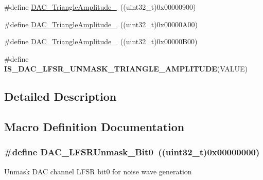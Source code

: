 \begin{DoxyCompactItemize}
\item 
\#define \hyperlink{group___d_a_c__lfsrunmask__triangleamplitude_ga7d573b0cebb1b939bd83367effb93d89}{D\+A\+C\+\_\+\+Triangle\+Amplitude\+\_}~((uint32\+\_\+t)0x00000900)
\item 
\#define \hyperlink{group___d_a_c__lfsrunmask__triangleamplitude_gad33d28d7fcc09d84500ea9b6e6c5feed}{D\+A\+C\+\_\+\+Triangle\+Amplitude\+\_}~((uint32\+\_\+t)0x00000\+A00)
\item 
\#define \hyperlink{group___d_a_c__lfsrunmask__triangleamplitude_ga3ce69f5a63a2464dc4b5f73cb6fe72f5}{D\+A\+C\+\_\+\+Triangle\+Amplitude\+\_}~((uint32\+\_\+t)0x00000\+B00)
\item 
\#define {\bfseries I\+S\+\_\+\+D\+A\+C\+\_\+\+L\+F\+S\+R\+\_\+\+U\+N\+M\+A\+S\+K\+\_\+\+T\+R\+I\+A\+N\+G\+L\+E\+\_\+\+A\+M\+P\+L\+I\+T\+U\+DE}(V\+A\+L\+UE)
\end{DoxyCompactItemize}


\subsection{Detailed Description}


\subsection{Macro Definition Documentation}
\subsubsection[{\texorpdfstring{D\+A\+C\+\_\+\+L\+F\+S\+R\+Unmask\+\_\+\+Bit0}{DAC_LFSRUnmask_Bit0}}]{\setlength{\rightskip}{0pt plus 5cm}\#define D\+A\+C\+\_\+\+L\+F\+S\+R\+Unmask\+\_\+\+Bit0~((uint32\+\_\+t)0x00000000)}\hypertarget{group___d_a_c__lfsrunmask__triangleamplitude_ga60794fd5092a332cfa82e1cee13945fc}{}\label{group___d_a_c__lfsrunmask__triangleamplitude_ga60794fd5092a332cfa82e1cee13945fc}
Unmask D\+AC channel L\+F\+SR bit0 for noise wave generation 
